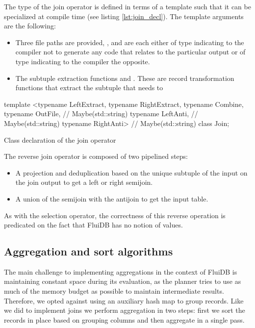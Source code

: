 The type of the join operator is defined in terms of a template such
that it can be specialized at compile time (see listing
\ref{lst:join_decl}). The template arguments are the following:

\begin{itemize}
\item Three file paths are provided, ,  and
   are each either of type  indicating to
  the compiler not to generate any code that relates to the particular
  output or of type  indicating to the compiler
  the opposite.
\item The subtuple extraction functions  and
  . These are record transformation functions that
  extract the subtuple that needs to
\end{itemize}

\begin{code}
\begin{cppcode}
template <typename LeftExtract, typename RightExtract, typename Combine,
          typename OutFile,    // Maybe(std::string)
          typename LeftAnti,   // Maybe(std::string)
          typename RightAnti>  // Maybe(std::string)
class Join;
\end{cppcode}
\caption{\label{lst:join_decl}Class declaration of the join operator}
\end{code}

The reverse join operator is composed of two pipelined steps:
\begin{itemize}
\item A projection and deduplication based on the unique subtuple of
the input on the join output to get a left or right semijoin.
\item A union of the semijoin with the antijoin to get the input table.
\end{itemize}

As with the selection operator, the correctness of this reverse
operation is predicated on the fact that FluiDB has no notion of
 values.

\subsection{Aggregation and sort algorithms}

The main challenge to implementing aggregations in the context of
FluiDB is maintaining constant space during its evaluation, as the
planner tries to use as much of the memory budget as possible to
maintain intermediate results. Therefore, we opted against using an
auxiliary hash map to group records. Like we did to implement
joins we perform aggregation in two steps: first we sort the records
in place based on grouping columns and then aggregate in a single
pass.

